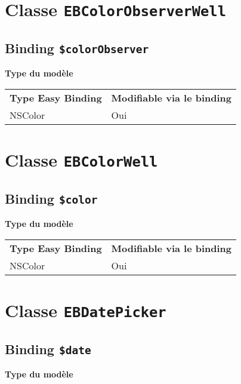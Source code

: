 \section{Classe \texttt{EBColorObserverWell}}

\subsection{Binding \texttt{\$colorObserver}}

{\bf Type du modèle}

\begin{tabular}{ll}
\textbf{Type Easy Binding} & \textbf{Modifiable via le binding}\\
NSColor& Oui\\
\end{tabular}







\section{Classe \texttt{EBColorWell}}

\subsection{Binding \texttt{\$color}}

{\bf Type du modèle}

\begin{tabular}{ll}
\textbf{Type Easy Binding} & \textbf{Modifiable via le binding}\\
NSColor& Oui\\
\end{tabular}







\section{Classe \texttt{EBDatePicker}}

\subsection{Binding \texttt{\$date}}

{\bf Type du modèle}

